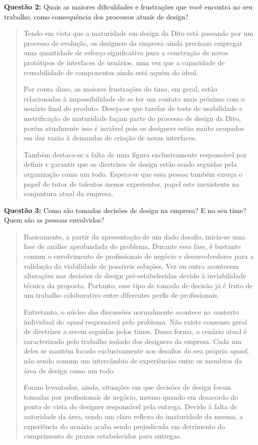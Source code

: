 \textbf{Questão 2:} Quais as maiores dificuldades e frustrações que você encontra no seu trabalho, como consequência dos processos atuais de design?

\begin{quote}
    Tendo em vista que a maturidade em design da Dito está passando por um processo de evolução, os designers da empresa ainda precisam empregar uma quantidade de esforço significativa para a construção de novos protótipos de interfaces de usuários, uma vez que a capacidade de reusabilidade de componentes ainda está aquém do ideal. 
    
    Por conta disso, as maiores frustrações do time, em geral, estão relacionadas à impossibilidade de se ter um contato mais próximo com o usuário final do produto. Deseja-se que tarefas de teste de usabilidade e metrificação de maturidade façam parte do processo de design da Dito, porém atualmente isso é inviável pois os designers estão muito ocupados em dar vazão à demandas de criação de novas interfaces.
    
    Também destaca-se a falta de uma figura exclusivamente responsável por definir e garantir que as diretrizes de design estão sendo seguidas pela organização como um todo. Espera-se que essa pessoa também exerça o papel de tutor de talentos menos experientes, papel este inexistente na conjuntura atual da empresa.
\end{quote}

\textbf{Questão 3:} Como são tomadas decisões de design na empresa? E no seu time? Quem são as pessoas envolvidas?

\begin{quote}
    Basicamente, a partir da apresentação de um dado desafio, inicia-se uma fase de análise aprofundada do problema. Durante essa fase, é bastante comum o envolvimento de profissionais de negócio e desenvolvedores para a validação da viabilidade de possíveis soluções. Vez ou outra acontecem alterações nas decisões de design pré-estabelecidas devido à inviabilidade técnica da proposta. Portanto, esse tipo de tomada de decisão já é fruto de um trabalho colaborativo entre diferentes perfis de profissionais.
    
    Entretanto, o núcleo das discussões normalmente acontece no contexto individual do \textit{squad} responsável pelo problema. Não existe consenso geral de diretrizes a serem seguidas pelos times. Dessa forma, o cenário atual é caracterizado pelo trabalho isolado dos designers da empresa. Cada um deles se mantém focado exclusivamente nos desafios do seu próprio \textit{squad}, não sendo comum um intercâmbio de experiências entre os membros da área de design como um todo.
    
    Foram levantadas, ainda, situações em que decisões de design foram tomadas por profissionais de negócio, mesmo quando em desacordo do ponto de vista do designer responsável pela entrega. Devido à falta de autoridade da área, sendo um claro reflexo da imaturidade da mesma, a experiência do usuário acaba sendo prejudicada em detrimento do cumprimento de prazos estabelecidos para entregas.
\end{quote}

